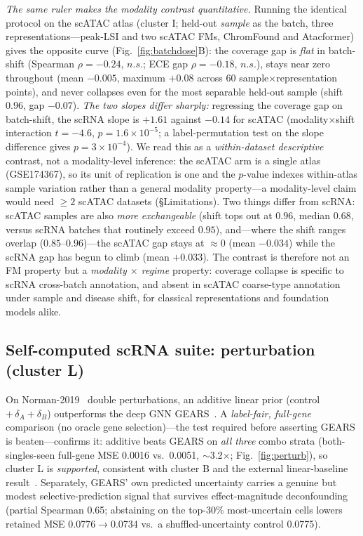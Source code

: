 \documentclass[11pt]{article}
\begin{document}
\emph{The same ruler makes the modality contrast quantitative.} Running the identical protocol on the scATAC atlas (cluster I; held-out \emph{sample} as the batch, three representations---peak-LSI and two scATAC FMs, ChromFound and Atacformer) gives the opposite curve (Fig.~\ref{fig:batchdose}B): the coverage gap is \emph{flat} in batch-shift (Spearman $\rho=-0.24$, $n.s.$; ECE gap $\rho=-0.18$, $n.s.$), stays near zero throughout (mean $-0.005$, maximum $+0.08$ across 60 sample$\times$representation points), and never collapses even for the most separable held-out sample (shift $0.96$, gap $-0.07$). \emph{The two slopes differ sharply:} regressing the coverage gap on batch-shift, the scRNA slope is $+1.61$ against $-0.14$ for scATAC (modality$\times$shift interaction $t=-4.6$, $p=1.6\times10^{-5}$; a label-permutation test on the slope difference gives $p=3\times10^{-4}$). We read this as a \emph{within-dataset descriptive} contrast, not a modality-level inference: the scATAC arm is a single atlas (GSE174367), so its unit of replication is one and the $p$-value indexes within-atlas sample variation rather than a general modality property---a modality-level claim would need $\geq2$ scATAC datasets (\S Limitations). Two things differ from scRNA: scATAC samples are also \emph{more exchangeable} (shift tops out at $0.96$, median $0.68$, versus scRNA batches that routinely exceed $0.95$), and---where the shift ranges overlap ($0.85$--$0.96$)---the scATAC gap stays at $\approx 0$ (mean $-0.034$) while the scRNA gap has begun to climb (mean $+0.033$). The contrast is therefore not an FM property but a \emph{modality $\times$ regime} property: coverage collapse is specific to scRNA cross-batch annotation, and absent in scATAC coarse-type annotation under sample and disease shift, for classical representations and foundation models alike.

\subsection{Self-computed scRNA suite: perturbation (cluster L)}
On Norman-2019~\cite{norman2019} double perturbations, an additive linear prior (control $+\,\delta_A+\delta_B$) outperforms the deep GNN GEARS~\cite{roohani2024}. A \emph{label-fair, full-gene} comparison (no oracle gene selection)---the test required before asserting GEARS is beaten---confirms it: additive beats GEARS on \emph{all three} combo strata (both-singles-seen full-gene MSE 0.0016 vs.\ 0.0051, $\sim$3.2$\times$; Fig.~\ref{fig:perturb}), so cluster L is \emph{supported}, consistent with cluster B and the external linear-baseline result~\cite{ahlmann2025}. Separately, GEARS' own predicted uncertainty carries a genuine but modest selective-prediction signal that survives effect-magnitude deconfounding (partial Spearman 0.65; abstaining on the top-30\% most-uncertain cells lowers retained MSE 0.0776$\to$0.0734 vs.\ a shuffled-uncertainty control 0.0775).
\end{document}

